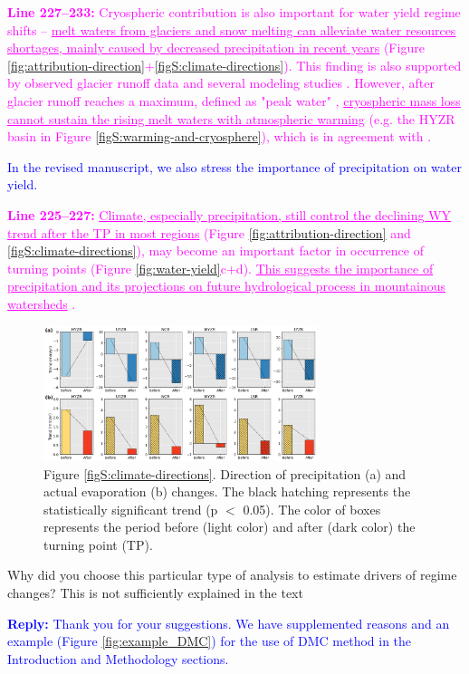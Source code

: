 \documentclass[11pt]{article}
\newcounter{reviewer}
\newcounter{point}[reviewer]
\renewcommand{\thepoint}{Comment\,\thereviewer.\arabic{point}:}
\newcommand{\point}[1]{\refstepcounter{point} \bigskip \noindent {\fontseries{b}\selectfont \thepoint} #1 \par}
\newcommand{\reply}[1]{\bigskip \textcolor{blue}{\noindent \textbf {Reply:} #1}}
\newcommand{\nextreply}[1]{\bigskip \textcolor{blue}{\noindent #1}}
\newcommand{\revised}[3][2]{\bigskip \textcolor{magenta}{\noindent \textbf{Line #2:} #3}}
\begin{document}
\revised{227--233}{Cryospheric contribution is also important for water yield regime shifts -- \ul{melt waters from glaciers and snow melting can alleviate water resources shortages, mainly caused by decreased precipitation in recent years} (Figure \ref{fig:attribution-direction}+\ref{figS:climate-directions}). This finding is also supported by observed glacier runoff data \citep{yao2010glacial} and several modeling studies \citep{lutz2014consistent, Zhang2020VariationOM, wang2021tp}. 
However, after glacier runoff reaches a maximum, defined as "peak water" \citep{gleick2010peak}, \ul{cryospheric mass loss cannot sustain the rising melt waters with atmospheric warming} (e.g. the HYZR basin in Figure \ref{figS:warming-and-cryosphere}), which is in agreement with \citet{huss2018global}.}

\nextreply{In the revised manuscript, we also stress the importance of precipitation on water yield.}

\revised{225--227}{\ul{Climate, especially precipitation, still control the declining WY trend after the TP in most regions} (Figure \ref{fig:attribution-direction} and \ref{figS:climate-directions}), may become an important factor in occurrence of turning points (Figure \ref{fig:water-yield}c+d).
\ul{This suggests the importance of precipitation and its projections on future hydrological process in mountainous watersheds} \citep{lutz2014consistent}.}

\begin{figure}[ht]
    \centering
    \includegraphics[width=8cm]{02-figures/P_AET_diections.png}
    \captionsetup{labelformat=empty}
    \caption{Figure \ref{figS:climate-directions}. Direction of precipitation (a) and actual evaporation (b) changes. 
    The black hatching represents the statistically significant trend (p $<$ 0.05).
    The color of boxes represents the period before
    (light color) and after (dark color) the turning point (TP).}
\end{figure}

\point{Why did you choose this particular type of analysis to estimate drivers of regime changes? This is not sufficiently explained in the text}
\reply{Thank you for your suggestions. We have supplemented reasons and an example (Figure \ref{fig:example_DMC}) for the use of DMC method in the Introduction and Methodology sections.}
\end{document}

